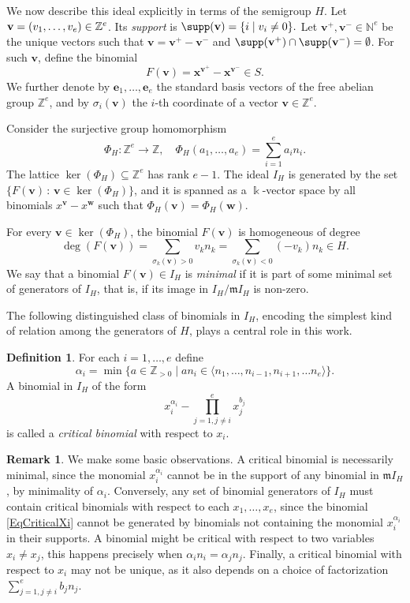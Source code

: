 \documentclass[11pt,twoside]{amsart}
\newcommand{\Z}{\mathbb Z}
\newcommand{\N}{\mathbb N}
\def\mm{\mathfrak m}
\def\bv{{\mathbf v}}
\def\bw{{\mathbf w}}
\def\bx{{\mathbf x}}
\def\be{{\mathbf e}}
\def\al{\alpha}
\theoremstyle{definition}
\newtheorem{rem}[Theorem]{Remark}
\newtheorem{defn}[Theorem]{Definition}
\numberwithin{equation}{section}
\begin{document}
We now describe this ideal explicitly in terms of the semigroup $H$.
Let ${\bf v}= (v_1,\ldots , v_e)\in \Z^e$.
Its {\em support} is
$\supp ({\bf v}) = \{ i \;|\; v_i\ne 0\}.$
Let $\bv^+, \bv^- \in \N^e$ be the unique vectors such that $\bv = \bv^+-\bv^-$ and $\supp(\bv^+)\cap \supp(\bv^-)=\emptyset$.
For such $\bv$,  define the binomial
\[
F(\bv) = \bx^{\bv^+} - \bx^{\bv^-}\in S.
\]
We further denote by $\be_1, \ldots, \be_e$ the standard basis vectors of the free abelian group $\Z^e$, and by  $\sigma_i(\bv)$ the $i$-th coordinate of a vector $\bv \in \Z^e$.

Consider the surjective group homomorphism
\[
\Phi_H : \Z^e \to \Z, \quad \Phi_H (a_1, \ldots , a_e) = \sum_{i=1}^e a_in_i.
\]  
The lattice $\ker(\Phi_H) \subseteq \Z^e$ has rank $e-1$.
The ideal $I_H$ is generated by the set $\{F(\bv) \,:\, \bv \in \ker(\Phi_H)\}$, and it is spanned as a $\Bbbk$-vector space by all binomials $x^\bv-x^\bw$ such that $\Phi_H(\bv)=\Phi_H(\bw)$.

For every $\bv \in \ker(\Phi_H)$,
the binomial $F(\bv)$ is homogeneous of degree 
$$
\deg(F(\bv)) = \sum_{\sigma_k(\bv)> 0} v_kn_k  =\sum_{\sigma_k(\bv)< 0} (-v_k)n_k\in H.
$$
We say that a binomial $F(\bv) \in I_H$ is {\em minimal} if it is part of some minimal set of generators of $I_H$, 
that is,
if its image in $I_H/\mm I_H$ is non-zero.

The following distinguished class of binomials in $I_H$,
encoding the simplest kind of relation among the generators of $H$,
plays a central role in this work.


\begin{defn}\label{DefCriticalBinomial}
For each $i =1, \ldots, e$   define 
\begin{equation*}
 \al_i = \min\big\{ a\in \Z_{>0}\; |\;  a n_i \in \langle n_1,\ldots ,n_{i-1},n_{i+1}, \ldots n_e\rangle\big\}.
\end{equation*}
A binomial in $I_H$ of the form 
\begin{equation}\label{EqCriticalXi}
x_i^{\al_i} - \prod_{j=1, j\ne i}^e x_j^{b_j}     
\end{equation}
is called a {\em critical binomial} with respect to $x_i$.
\end{defn}

\begin{rem}\label{RemBasicObservationsCritical}
We make some basic observations.
A critical binomial is necessarily minimal,
since the monomial  $x_i^{\alpha_i}$ cannot be in the support of any binomial in $\mm I_H$, by minimality of $\alpha_i$.
Conversely, any set of binomial generators of $I_H$ must contain critical binomials with respect to each $x_1, \ldots, x_e$,
since the binomial \eqref{EqCriticalXi} cannot be generated by  binomials not containing the monomial $x_i^{\alpha_i}$  in their supports.
A binomial might be critical with respect to two variables $x_i \ne x_j$, this happens precisely when $\alpha_i n_i = \alpha_j n_j$.
Finally, a critical binomial with respect to $x_i$ may not be unique, as 
it also depends on a choice of factorization $\sum_{j=1, j\ne i}^e b_jn_j$. 
\end{rem}
\end{document}
